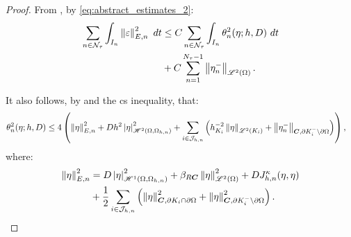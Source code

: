 \begin{proof}
    From , by \cref{eq:abstract_estimates_2}:
    \begin{align*}
        \sum_{n \in \mathcal{N}_{\tau}} \int_{I_n} \left\lVert \varepsilon \right\rVert_{E, n}^2 ~ dt &\leq C \sum_{n \in \mathcal{N}_{\tau}} \int_{I_n} \theta_n^2(\eta; h, D) ~ dt \\
        &+ C \sum_{n = 1}^{N_{\tau} - 1} \left\lVert \eta_n^- \right\rVert_{\mathscr{L}^{2}(\Omega)}.
    \end{align*}

    It also follows, by  and the \acrshort{cs} inequality, that:
    \begin{align*}
        \theta_n^2(\eta; h, D) &\leq 4 \left( \left\lVert \eta \right\rVert_{E, n}^2 + D h^2 \left\lvert \eta \right\rvert_{\mathscr{H}^{2}(\Omega, \Omega_{h, n})}^2 + \sum_{i \in \mathcal{J}_{h, n}} \left( h_{K_i}^{-2} \left\lVert \eta \right\rVert_{\mathscr{L}^{2}(K_i)} + \left\lVert \eta_n^- \right\rVert_{\bm{C}, \partial K_i^- \setminus \partial \Omega} \right) \right),
    \end{align*}
    where:
    \begin{align*}
        \left\lVert \eta \right\rVert_{E, n}^2 &= D \left\lvert \eta \right\rvert_{\mathscr{H}^{1}(\Omega, \Omega_{h, n})}^2 + \beta_{R \bm{C}} \left\lVert \eta \right\rVert_{\mathscr{L}^{2}(\Omega)}^2 + D J^{\kappa}_{h, n}(\eta, \eta) \\
        &+ \frac{1}{2} \sum_{i \in \mathcal{J}_{h, n}} \left( \left\lVert \eta \right\rVert_{\bm{C}, \partial K_i \cap \partial \Omega}^2 + \left\lVert \eta \right\rVert_{\bm{C}, \partial K_i^- \setminus \partial \Omega}^2 \right).
    \end{align*}


\end{proof}
